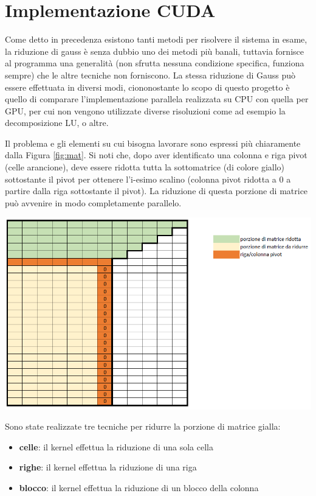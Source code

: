 \documentclass{article}
\begin{document}
\section{Implementazione CUDA}

Come detto in precedenza esistono tanti metodi per risolvere il sistema in esame, la riduzione di gauss è senza dubbio uno dei metodi più banali, tuttavia fornisce al programma una generalità (non sfrutta nessuna condizione specifica, funziona sempre) che le altre tecniche non forniscono. La stessa riduzione di Gauss può essere effettuata in diversi modi, ciononostante lo scopo di questo progetto è quello di comparare l'implementazione parallela realizzata su CPU con quella per GPU, per cui non vengono utilizzate diverse risoluzioni come ad esempio la decomposizione LU, o altre.

Il problema e gli elementi su cui bisogna lavorare sono espressi più chiaramente dalla Figura \ref{fig:mat}. Si noti che, dopo aver identificato una colonna e riga pivot (celle arancione), deve essere ridotta tutta la sottomatrice (di colore giallo) sottostante il pivot per ottenere l'i-esimo scalino (colonna pivot ridotta a 0 a partire dalla riga sottostante il pivot). La riduzione di questa porzione di matrice può avvenire in modo completamente parallelo.

	\begin{center}
		\includegraphics[width = \textwidth]{matrice.png}
		\label{fig:mat}
	\end{center}


Sono state realizzate tre tecniche per ridurre la porzione di matrice gialla:
\begin{itemize}
\item \textbf{celle}: il kernel effettua la riduzione di una sola cella
\item \textbf{righe}: il kernel effettua la riduzione di una riga 
\item \textbf{blocco}: il kernel effettua la riduzione di un blocco della colonna
\end{itemize}
\end{document}
